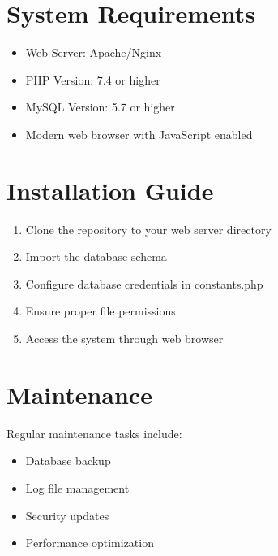 \documentclass[11pt,a4paper]{article}
\begin{document}
\section{System Requirements}
\begin{itemize}
    \item Web Server: Apache/Nginx
    \item PHP Version: 7.4 or higher
    \item MySQL Version: 5.7 or higher
    \item Modern web browser with JavaScript enabled
\end{itemize}

\section{Installation Guide}
\begin{enumerate}
    \item Clone the repository to your web server directory
    \item Import the database schema
    \item Configure database credentials in constants.php
    \item Ensure proper file permissions
    \item Access the system through web browser
\end{enumerate}

\section{Maintenance}
Regular maintenance tasks include:
\begin{itemize}
    \item Database backup
    \item Log file management
    \item Security updates
    \item Performance optimization
\end{itemize}
\end{document}
